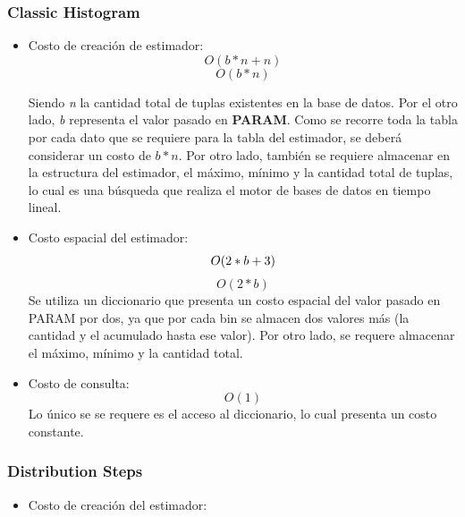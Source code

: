 \documentclass[10pt, a4paper,english,spanish,hidelinks]{article}
\begin{document}
{\subsubsection{Classic Histogram}
\begin{itemize}

\item Costo de creación de estimador:
\begin{equation}
O(b * n + n )
\end{equation}
\begin{equation}
O(b * n)
\end{equation}

Siendo \textit{n} la cantidad total de tuplas existentes en la base de datos.
Por el otro lado, \textit{b} representa el valor pasado en \textbf{PARAM}.
Como se recorre toda la tabla por cada dato que se requiere para la tabla del estimador,
se deberá considerar un costo de $b * n$. Por otro lado, también se requiere almacenar en
la estructura del estimador, el máximo, mínimo y la cantidad total de tuplas, lo cual es
una búsqueda que realiza el motor de bases de datos en tiempo lineal.

\item Costo espacial del estimador:
\begin{equation}
O(2 * b + 3 ) \\
\end{equation}
\begin{equation}
O(2 * b)
\end{equation}
Se utiliza un diccionario que presenta un costo espacial del valor pasado en PARAM por dos,
ya que por cada bin se almacen dos valores más (la cantidad y el acumulado hasta ese valor).
Por otro lado, se requere almacenar el máximo, mínimo y la cantidad total.

\item Costo de consulta:
\begin{equation}
O(1)
\end{equation}
Lo único se se requere es el acceso al diccionario, lo cual presenta un costo constante.

\end{itemize}
\subsubsection{Distribution Steps}

\begin{itemize}

\item Costo de creación del estimador:


\end{itemize}}
\end{document}

